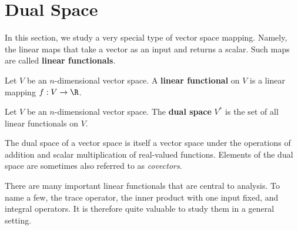 \section{Dual Space}
\label{sec:dual}
In this section, we study a very special type of vector space mapping. Namely, the linear maps that take a vector as an input and returns a scalar. Such maps are called \textbf{linear functionals}.
\begin{definition}
  Let \( V \) be an \( n \)-dimensional vector space. A \textbf{linear functional} on \( V \) is a linear mapping \( f:V\to\R \).
\end{definition}

\begin{definition}
  Let \( V \) be an \( n \)-dimensional vector space. The \textbf{dual space} \( V^* \) is the set of all linear functionals on \( V \).
\end{definition}

The dual space of a vector space is itself a vector space under the operations of addition and scalar multiplication of real-valued functions. Elements of the dual space are sometimes also referred to as \emph{covectors}.

\vspace{3mm}

There are many important linear functionals that are central to analysis. To name a few, the trace operator, the inner product with one input fixed, and integral operators. It is therefore quite valuable to study them in a general setting.

\vspace{3mm}

